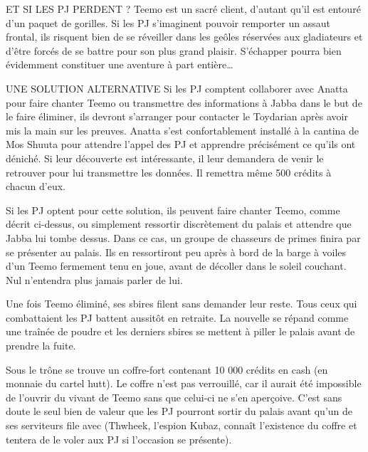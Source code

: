 \documentclass[a4paper,10pt,twoside,twocolumn,openany]{book}
\begin{document}
\begin{commentbox}{ET SI LES PJ PERDENT ?}
  Teemo est un sacré client, d’autant qu’il est entouré d’un paquet de gorilles. Si les PJ s’imaginent
pouvoir remporter un assaut frontal, ils risquent
bien de se réveiller dans les geôles réservées aux
gladiateurs et d’être forcés de se battre pour son
plus grand plaisir. S’échapper pourra bien évidemment constituer une aventure à part entière…
\end{commentbox}

\begin{commentbox}{UNE SOLUTION ALTERNATIVE}
Si les PJ comptent collaborer avec Anatta pour faire
chanter Teemo ou transmettre des informations à
Jabba dans le but de le faire éliminer, ils devront
s’arranger pour contacter le Toydarian après avoir
mis la main sur les preuves. Anatta s’est confortablement installé à la cantina de Mos Shuuta pour
attendre l’appel des PJ et apprendre précisément
ce qu’ils ont déniché. Si leur découverte est intéressante, il leur demandera de venir le retrouver
pour lui transmettre les données. Il remettra même
500 crédits à chacun d’eux.

Si les PJ optent pour cette solution, ils peuvent
faire chanter Teemo, comme décrit ci-dessus, ou
simplement ressortir discrètement du palais et attendre que Jabba lui tombe dessus. Dans ce cas,
un groupe de chasseurs de primes finira par se
présenter au palais. Ils en ressortiront peu après
à bord de la barge à voiles d’un Teemo fermement
tenu en joue, avant de décoller dans le soleil couchant. Nul n’entendra plus jamais parler de lui.
\end{commentbox}

\subtitle{BONNE NOUVELLE,
LE HUTT EST MORT}

Une fois Teemo éliminé, ses sbires filent sans demander
leur reste. Tous ceux qui combattaient les PJ battent
aussitôt en retraite. La nouvelle se répand comme
une traînée de poudre et les derniers sbires
se mettent à piller le palais avant de
prendre la fuite.

Sous le trône se trouve un
coffre-fort contenant 10 000
crédits en cash (en monnaie
du cartel hutt). Le coffre n’est
pas verrouillé, car il aurait
été impossible de l’ouvrir du
vivant de Teemo sans que celui-ci ne s’en aperçoive. C’est
sans doute le seul bien de valeur que les PJ pourront sortir
du palais avant qu’un de ses
serviteurs file avec (Thwheek,
l’espion Kubaz, connaît l’existence du coffre et tentera de
le voler aux PJ si l’occasion
se présente).
\end{document}
